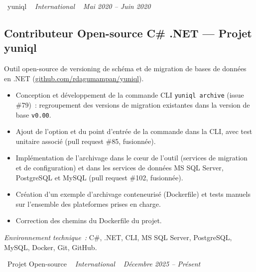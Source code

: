 \documentclass[10pt,a4paper]{article}
\begin{document}
\vspace{10pt}

\noindent\textcolor{primary}{ \faBuilding\ yuniql} \quad
\textit{ \small \textcolor{darkgray}{ \faMapMarker\ } International } \hfill
\textit{ \small \textcolor{darkgray}{ \faCalendar\ } Mai 2020 -- Juin 2020 }

\vspace{4pt}

\subsection*{Contributeur Open-source C\# .NET --- Projet yuniql}
\color{darkgray}
Outil open-source de versioning de schéma et de migration de bases de données en .NET (\href{https://github.com/rdagumampan/yuniql}{github.com/rdagumampan/yuniql}).
\begin{itemize}
  \item Conception et développement de la commande CLI \texttt{yuniql archive} (issue \#79)~: regroupement des versions de migration existantes dans la version de base \texttt{v0.00}.
  \item Ajout de l'option et du point d'entrée de la commande dans la CLI, avec test unitaire associé (pull request \#85, fusionnée).
  \item Implémentation de l'archivage dans le cœur de l'outil (services de migration et de configuration) et dans les services de données MS SQL Server, PostgreSQL et MySQL (pull request \#102, fusionnée).
  \item Création d'un exemple d'archivage conteneurisé (Dockerfile) et tests manuels sur l'ensemble des plateformes prises en charge.
  \item Correction des chemins du Dockerfile du projet.
\end{itemize}
\textit{Environnement technique~:} C\#, .NET, CLI, MS SQL Server, PostgreSQL, MySQL, Docker, Git, GitHub.

\vspace{10pt}

\noindent\textcolor{primary}{ \faBuilding\ Projet Open-source} \quad
\textit{ \small \textcolor{darkgray}{ \faMapMarker\ } International } \hfill
\textit{ \small \textcolor{darkgray}{ \faCalendar\ } Décembre 2025 -- Présent }

\vspace{4pt}
\end{document}
